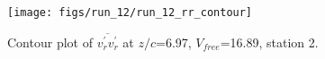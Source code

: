 \begin{figure}[H]
\centering
\texttt{[image: figs/run\_12/run\_12\_rr\_contour]}
\caption{Contour plot of $\overline{v_{r}^{\prime} v_{r}^{\prime}}$ at $z/c$=6.97, $V_{free}$=16.89, station 2.}
\label{fig:run_12_rr_contour}
\end{figure}



